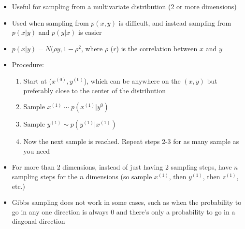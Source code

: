 \documentclass{article}
\begin{document}
\begin{itemize}
    \item Useful for sampling from a multivariate distribution (2 or more dimensions)
    \item Used when sampling from $p(x,y)$ is difficult, and instead sampling from $p(x|y)$ and $p(y|x)$ is easier
    \item $p(x|y)=N(\rho y, 1- \rho^2$, where $\rho$ ($r$) is the correlation between $x$ and $y$
    \item Procedure:
    \begin{enumerate}
        \item Start at ($x^{(0)}, y^{(0)}$), which can be anywhere on the $(x, y)$ but preferably close to the center of the distribution
        \item Sample $x^{(1)} \sim p(x^{(1)}|y^{0})$
        \item Sample $y^{(1)} \sim p(y^{(1)}|x^{(1)})$
        \item Now the next sample is reached. Repeat steps 2-3 for as many sample as you need
    \end{enumerate}
    \item For more than 2 dimensions, instead of just having 2 sampling steps, have $n$ sampling steps for the $n$ dimensions (so sample $x^{(1)}$, then $y^{(1)}$, then $z^{(1)}$, etc.)
    \item Gibbs sampling does not work in some cases, such as when the probability to go in any one direction is always $0$ and there's only a probability to go in a diagonal direction
\end{itemize}
\end{document}

